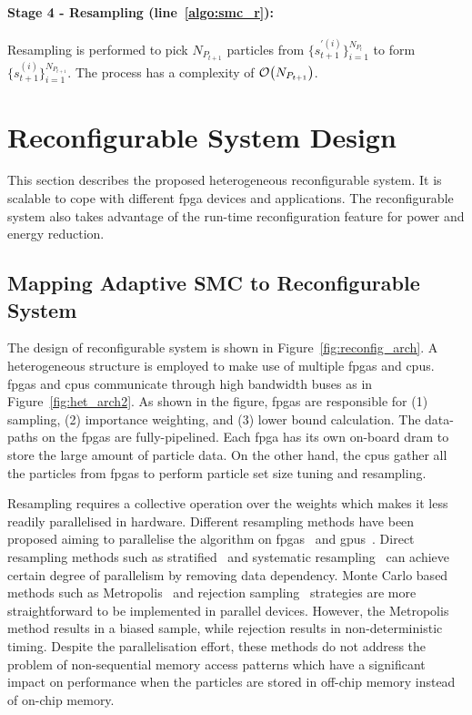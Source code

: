 \paragraph{Stage 4 - Resampling (line~\ref{algo:smc_r}): }

Resampling is performed to pick ${N_{P_{t+1}}}$ particles from $\{s_{t+1}^{\prime(i)}\}^{N_{P_t}}_{i=1}$ to form $\{s_{t+1}^{(i)}\}^{N_{P_{t+1}}}_{i=1}$.
The process has a complexity of $\mathop{}\mathopen{}\mathcal{O}\mathopen{}\left(N_{P_{t+1}}\right)$.

\section{Reconfigurable System Design}
\label{sec:reconfig_hrs}

This section describes the proposed heterogeneous reconfigurable system.
It is scalable to cope with different \gls{fpga} devices and applications.
The reconfigurable system also takes advantage of the run-time reconfiguration feature for power and energy reduction.

\subsection{Mapping Adaptive SMC to Reconfigurable System}
\label{sec:reconfig_arch}

The design of reconfigurable system is shown in Figure~\ref{fig:reconfig_arch}.
A heterogeneous structure is employed to make use of multiple \glspl{fpga} and \glspl{cpu}.
\glspl{fpga} and \glspl{cpu} communicate through high bandwidth buses as in Figure~\ref{fig:het_arch2}.
As shown in the figure, \glspl{fpga} are responsible for (1) sampling, (2) importance weighting, and (3) lower bound calculation.
The data-paths on the \glspl{fpga} are fully-pipelined.
Each \gls{fpga} has its own on-board \gls{dram} to store the large amount of particle data.
On the other hand, the \glspl{cpu} gather all the particles from \glspl{fpga} to perform particle set size tuning and resampling.

Resampling requires a collective operation over the weights which makes it less readily parallelised in hardware.
Different resampling methods have been proposed aiming to parallelise the algorithm on \glspl{fpga}~\cite{bolic05} and \glspl{gpu}~\cite{murray14}.
Direct resampling methods such as stratified~\cite{sarndal03} and systematic resampling~\cite{douc05} can achieve certain degree of parallelism by removing data dependency.
Monte Carlo based methods such as Metropolis~\cite{metropolis53} and rejection sampling~\cite{neal03} strategies are more straightforward to be implemented in parallel devices.
However, the Metropolis method results in a biased sample, while rejection results in non-deterministic timing.
Despite the parallelisation effort, these methods do not address the problem of non-sequential memory access patterns which have a significant impact on performance when the particles are stored in off-chip memory instead of on-chip memory.

